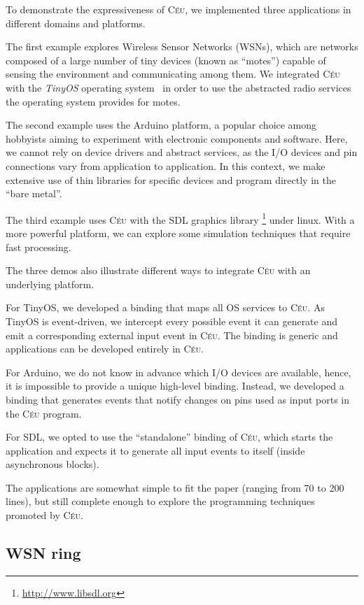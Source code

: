 \documentclass[11pt,a4paper]{article}
\newcommand{\2}{\;\;}
\newcommand{\5}{\;\;\;\;\;}
\newcommand{\CEU}{\textsc{C\'{e}u}}
\begin{document}
To demonstrate the expressiveness of \CEU{}, we implemented three applications 
in different domains and platforms.

The first example explores Wireless Sensor Networks (WSNs), which are networks 
composed of a large number of tiny devices (known as ``motes'') capable of 
sensing the environment and communicating among them.
We integrated \CEU{} with the \emph{TinyOS} operating system~\cite{wsn.tos} in 
order to use the abstracted radio services the operating system provides for 
motes.

The second example uses the Arduino platform, a popular choice among hobbyists 
aiming to experiment with electronic components and software.
Here, we cannot rely on device drivers and abstract services, as the I/O 
devices and pin connections vary from application to application.
In this context, we make extensive use of thin libraries for specific devices 
and program directly in the ``bare metal''.

The third example uses \CEU{} with the SDL graphics library%
\footnote{\url{http://www.libsdl.org}} under linux.
With a more powerful platform, we can explore some simulation techniques that 
require fast processing.

The three demos also illustrate different ways to integrate \CEU{} with an 
underlying platform.

For TinyOS, we developed a binding that maps all OS services to \CEU.
As TinyOS is event-driven, we intercept every possible event it can generate 
and emit a corresponding external input event in \CEU.
The binding is generic and applications can be developed entirely in \CEU.

For Arduino, we do not know in advance which I/O devices are available, hence, 
it is impossible to provide a unique high-level binding.
Instead, we developed a binding that generates events that notify changes on 
pins used as input ports in the \CEU{} program.

For SDL, we opted to use the ``standalone'' binding of \CEU{}, which starts the 
application and expects it to generate all input events to itself (inside 
asynchronous blocks).

The applications are somewhat simple to fit the paper (ranging from 70 to 200 
lines), but still complete enough to explore the programming techniques 
promoted by \CEU{}.

\subsection{WSN ring}
\label{sec:demos:ring}
\end{document}
